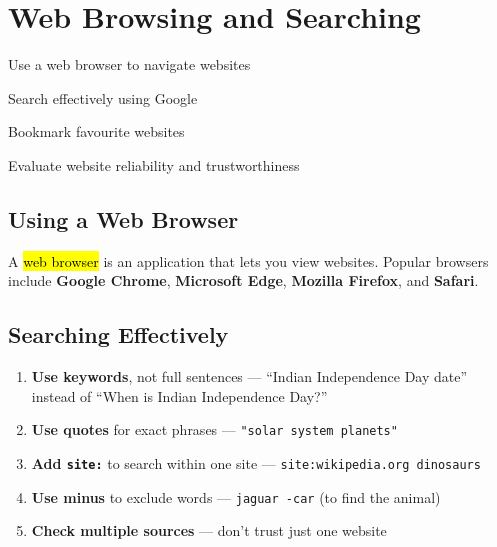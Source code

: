 \chapter{Web Browsing and Searching}
\label{ch:browsing}

\begin{objectives}
  \item Use a web browser to navigate websites
  \item Search effectively using Google
  \item Bookmark favourite websites
  \item Evaluate website reliability and trustworthiness
\end{objectives}


\section{Using a Web Browser}
\label{sec:browser}

A \hl{web browser} is an application that lets you view websites. Popular browsers include \textbf{Google Chrome}, \textbf{Microsoft Edge}, \textbf{Mozilla Firefox}, and \textbf{Safari}.

\section{Searching Effectively}
\label{sec:searching}

\begin{theorybox}
\begin{enumerate}[label=\textcolor{ModuleBlue}{\textbf{\arabic*.}}, itemsep=3pt]
  \item \textbf{Use keywords}, not full sentences --- ``Indian Independence Day date'' instead of ``When is Indian Independence Day?''
  \item \textbf{Use quotes} for exact phrases --- \texttt{"solar system planets"}
  \item \textbf{Add \texttt{site:}} to search within one site --- \texttt{site:wikipedia.org dinosaurs}
  \item \textbf{Use minus} to exclude words --- \texttt{jaguar -car} (to find the animal)
  \item \textbf{Check multiple sources} --- don't trust just one website
\end{enumerate}
\end{theorybox}

